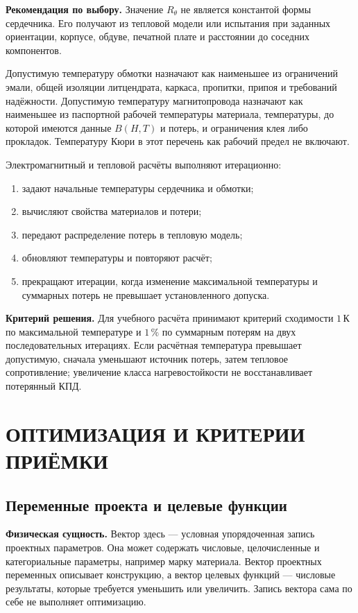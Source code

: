 \documentclass[14pt,a4paper]{extarticle}
\newcommand{\phys}{\par\noindent\textbf{Физическая сущность.} }
\newcommand{\recommend}{\par\noindent\textbf{Рекомендация по выбору.} }
\newcommand{\criterion}{\par\noindent\textbf{Критерий решения.} }
\begin{document}
\recommend Значение $R_{\theta}$ не является константой формы
сердечника. Его получают из тепловой модели или испытания при заданных
ориентации, корпусе, обдуве, печатной плате и расстоянии до соседних
компонентов.

Допустимую температуру обмотки назначают как наименьшее из ограничений
эмали, общей изоляции литцендрата, каркаса, пропитки, припоя и требований
надёжности. Допустимую температуру магнитопровода назначают как наименьшее из
паспортной рабочей температуры материала, температуры, до которой имеются
данные $B(H,T)$ и потерь, и ограничения клея либо прокладок. Температуру Кюри
в этот перечень как рабочий предел не включают.

Электромагнитный и тепловой расчёты выполняют итерационно:
\begin{enumerate}
 \item задают начальные температуры сердечника и обмотки;
 \item вычисляют свойства материалов и потери;
 \item передают распределение потерь в тепловую модель;
 \item обновляют температуры и повторяют расчёт;
 \item прекращают итерации, когда изменение максимальной температуры и
 суммарных потерь не превышает установленного допуска.
\end{enumerate}

\criterion Для учебного расчёта принимают критерий сходимости
$1\,\text{К}$ по максимальной температуре и $1\,\%$ по суммарным потерям на
двух последовательных итерациях. Если расчётная температура превышает
допустимую, сначала уменьшают источник потерь, затем тепловое сопротивление;
увеличение класса нагревостойкости не восстанавливает потерянный КПД.

\section{ОПТИМИЗАЦИЯ И КРИТЕРИИ ПРИЁМКИ}
\label{sec:optimization}

\subsection{Переменные проекта и целевые функции}

\phys Вектор здесь --- условная упорядоченная запись проектных параметров.
Она может содержать числовые, целочисленные и категориальные параметры,
например марку материала. Вектор проектных переменных описывает конструкцию,
а вектор целевых функций --- числовые результаты, которые требуется
уменьшить или увеличить. Запись вектора сама по себе не выполняет
оптимизацию.
\end{document}
